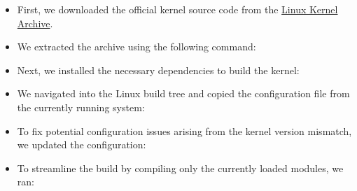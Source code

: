 \begin{itemize}
\item
  First, we downloaded the official kernel source code from the
  \href{https://cdn.kernel.org/pub/linux/kernel/}{Linux Kernel Archive}.
\item
  We extracted the archive using the following command:

\begin{Shaded}
\begin{Highlighting}[]
\end{Highlighting}
\end{Shaded}
\item
  Next, we installed the necessary dependencies to build the kernel:

\begin{Shaded}
\begin{Highlighting}[]
\end{Highlighting}
\end{Shaded}
\item
  We navigated into the Linux build tree and copied the configuration
  file from the currently running system:

\begin{Shaded}
\begin{Highlighting}[]
\VariableTok{$(}\VariableTok{)}
\end{Highlighting}
\end{Shaded}
\item
  To fix potential configuration issues arising from the kernel version
  mismatch, we updated the configuration:

\begin{Shaded}
\begin{Highlighting}[]
\end{Highlighting}
\end{Shaded}
\item
  To streamline the build by compiling only the currently loaded
  modules, we ran:

\begin{Shaded}
\begin{Highlighting}[]
\end{Highlighting}
\end{Shaded}
\end{itemize}

